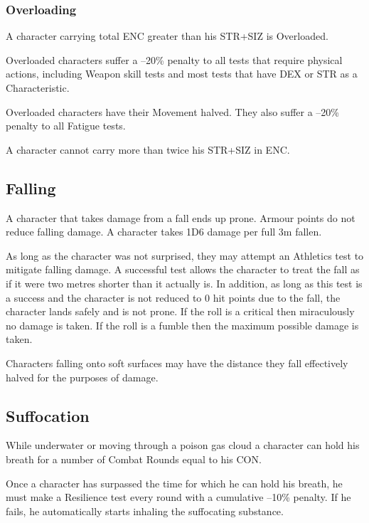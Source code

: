 \subsubsection{Overloading}
A character carrying total ENC greater than his STR+SIZ is Overloaded. 
\begin{rpg-list}
\item Overloaded characters suffer a –20\% penalty to all tests that require physical actions, including Weapon skill tests and most tests that have DEX or STR as a Characteristic. 

\item Overloaded characters have their Movement halved. They also suffer a –20\% penalty to all Fatigue tests. 
\end{rpg-list}

A character cannot carry more than twice his STR+SIZ in ENC. 

\subsection{Falling}
\label{ssec:falling}
A character that takes damage from a fall ends up prone. Armour points do not reduce falling damage. 
A character takes 1D6 damage per full 3m fallen.

As long as the character was not surprised, they may attempt an Athletics test to mitigate falling damage. A successful test allows the character to treat the fall as if it were two metres shorter than it actually is. In addition, as long as this test is a success and the character is not reduced to 0 hit points due to the fall, the character lands safely and is not prone. If the roll is a critical then miraculously no damage is taken. If the roll is a fumble then the maximum possible damage is taken.

Characters falling onto soft surfaces may have the distance they fall effectively halved for the purposes of damage. 


\subsection{Suffocation}
\label{ssec:suffocation}
While underwater or moving through a poison gas cloud a character can hold his breath for a number of Combat Rounds equal to his CON. 

Once a character has surpassed the time for which he can hold his breath, he must make a Resilience test every round with a cumulative –10\% penalty. If he fails, he automatically starts inhaling the suffocating substance.

